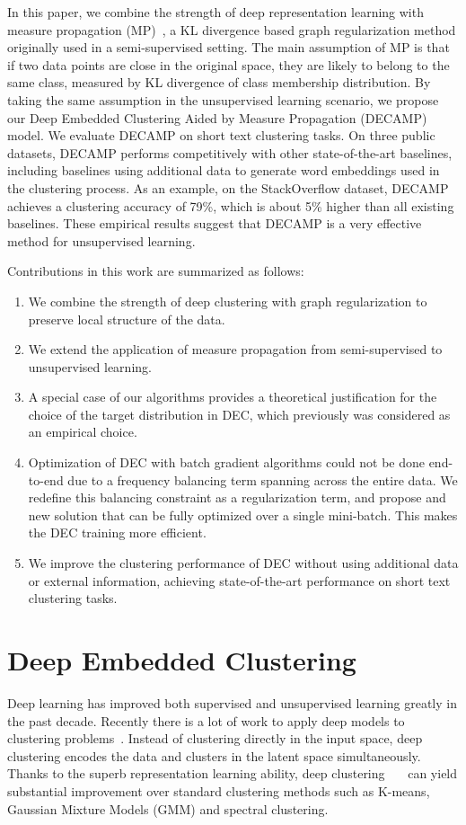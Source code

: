 \documentclass[letterpaper]{article}
\begin{document}
In this paper, we combine the strength of deep representation learning with measure propagation (MP)~\cite{mp}, a KL divergence based graph regularization method originally used in a semi-supervised setting. The main assumption of MP is that if two data points are close in the original space, they are likely to belong to the same class, measured by KL divergence of class membership distribution. By taking the same assumption in the unsupervised learning scenario, we propose our Deep Embedded Clustering Aided by Measure Propagation (DECAMP) model. We evaluate DECAMP on short text clustering tasks. On three public datasets, DECAMP performs competitively with other state-of-the-art baselines, including baselines using additional data to generate word embeddings used in the clustering process. As an example, on the StackOverflow dataset, DECAMP achieves a clustering accuracy of 79\%, which is about 5\% higher than all existing baselines. These empirical results suggest that DECAMP is a very effective method for unsupervised learning.

Contributions in this work are summarized as follows:
\begin{enumerate}
     \item We combine the strength of deep clustering with graph regularization to preserve local structure of the data.
     \item We extend the application of measure propagation from semi-supervised to unsupervised learning.
     \item A special case of our algorithms provides a theoretical justification for the choice of the target distribution in DEC, which previously was considered as an empirical choice.
     \item Optimization of DEC with batch gradient algorithms could not be done end-to-end due to a frequency balancing term spanning across the entire data. We redefine this balancing constraint as a regularization term, and propose and new solution that can be fully optimized over a single mini-batch. This makes the DEC training more efficient.
     \item We improve the clustering performance of DEC without using additional data or external information, achieving state-of-the-art performance on short text clustering tasks.
\end{enumerate}
 


\section{Deep Embedded Clustering}\label{dec0}
Deep learning has improved both supervised and unsupervised learning greatly in the past decade. Recently there is a lot of work to apply deep models to clustering problems~\cite{survey}. Instead of clustering directly in the input space, deep clustering encodes the data and clusters in the latent space simultaneously. Thanks to the superb representation learning ability, deep clustering~\cite{infogan}~\cite{vade}~\cite{friendly} can yield substantial improvement over standard clustering methods such as K-means, Gaussian Mixture Models (GMM) and spectral clustering. 
\end{document}
